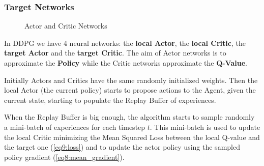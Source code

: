 \documentclass[a4paper, 11pt]{article}
\begin{document}
	\subsubsection{Target Networks} 
	\begin{figure}[!h]
		\begin{center}
		\end{center}		
		\caption{Actor and Critic Networks}
		\label{fig:actor_critic}
	\end{figure}
	In DDPG we have 4 neural networks: the \textbf{local Actor}, the \textbf{local Critic}, the \textbf{target Actor} and the \textbf{target Critic}. The aim of Actor networks is to approximate the \textbf{Policy} while the Critic networks approximate the \textbf{Q-Value}.
	
	Initially Actors and Critics have the same randomly initialized weights. Then the local Actor (the current policy) starts to propose actions to the Agent, given the current state, starting to populate the Replay Buffer of experiences.
	
	When the Replay Buffer is big enough, the algorithm starts to sample randomly a mini-batch of experiences for each timestep $t$. This mini-batch is used to update the local Critic minimizing the Mean Squared Loss between the local Q-value and the target one (\vref{eq9:loss}) and to update the actor policy using the sampled policy gradient (\vref{eq8:mean_gradient}).
	
\end{document}
